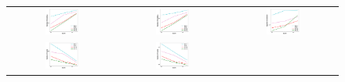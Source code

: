\begin{figure}
\centering
	\begin{tabular}{ccc}
	\hspace{-2em} \includegraphics[width=0.33\textwidth]{fig/paper-stronglycvxsmthspeedupEpochsT-min-w8a-epsilon0131-reg1e-05.pdf} &
	\includegraphics[width=0.33\textwidth]{fig/paper-cvxsmoothspeedupEpochsT-min-w8a-epsilon0134-reg0.pdf} & 
	\includegraphics[width=0.33\textwidth]{fig/paper-linregressionspeedupEpochsT-min-linearregressionw8a-epsilon002-reg0.pdf} \\
	\hspace{-2em} \includegraphics[width=0.33\textwidth]{fig/paper-stronglycvxsmthspeedupEpochsRounds-min-w8a-epsilon0131-reg1e-05.pdf} &
	\includegraphics[width=0.33\textwidth]{fig/paper-cvxsmoothspeedupEpochsRounds-min-w8a-epsilon0134-reg0.pdf} & 

\end{tabular}
\end{figure}
